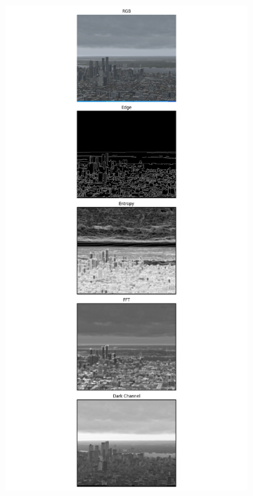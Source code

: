 \begin{figure}
\begin{subfigure}[b]{0.15\textwidth}
      \label{subfig:bin3}
          \caption{}
    \end{subfigure}
    \begin{subfigure}[b]{0.15\textwidth}
      \includegraphics[width=\textwidth, trim={7.5cm 0 7.5cm 0},clip]{imgs/examples/exp_0_featuresMiles_46.1462462872979_featuresM_74265_features.png}
      \label{subfig:bin4}
          \caption{}
    \end{subfigure}
  

\end{figure}
